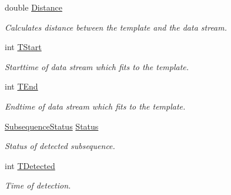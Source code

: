 \begin{DoxyCompactItemize}
\item 
double \hyperlink{struct_rowing_monitor_1_1_model_1_1_util_1_1_subsequence_a9f07ec73d4dcc7cb1d9e97f7e979fcc1}{Distance}
\begin{DoxyCompactList}\small\item\em Calculates distance between the template and the data stream. \end{DoxyCompactList}\item 
int \hyperlink{struct_rowing_monitor_1_1_model_1_1_util_1_1_subsequence_af085c001955793f45836d6c1cf3d4882}{T\+Start}
\begin{DoxyCompactList}\small\item\em Starttime of data stream which fits to the template. \end{DoxyCompactList}\item 
int \hyperlink{struct_rowing_monitor_1_1_model_1_1_util_1_1_subsequence_a839b2f62176c2546a8e0d42b87801954}{T\+End}
\begin{DoxyCompactList}\small\item\em Endtime of data stream which fits to the template. \end{DoxyCompactList}\item 
\hyperlink{namespace_rowing_monitor_1_1_model_1_1_util_a248a257b884983ed79c45a8b34ee9580}{Subsequence\+Status} \hyperlink{struct_rowing_monitor_1_1_model_1_1_util_1_1_subsequence_a437775e5f7ee4b63b6a33a01ef46bf0c}{Status}
\begin{DoxyCompactList}\small\item\em Status of detected subsequence. \end{DoxyCompactList}\item 
int \hyperlink{struct_rowing_monitor_1_1_model_1_1_util_1_1_subsequence_aaaed8840b79d2c683073ecf408bc6d51}{T\+Detected}
\begin{DoxyCompactList}\small\item\em Time of detection. \end{DoxyCompactList}\end{DoxyCompactItemize}


